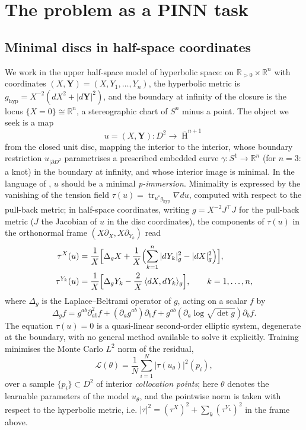 \documentclass[oneside,british]{amsart}
\numberwithin{equation}{section}
\numberwithin{figure}{section}
\theoremstyle{plain}
\numberwithin{thm}{section}
\theoremstyle{plain}
\theoremstyle{plain}
\theoremstyle{definition}
\theoremstyle{remark}
\DeclareMathOperator{\HH}{\mathrm{H}}
\DeclareMathOperator{\tr}{\mathrm{tr}}
\DeclareMathOperator{\hyp}{\mathrm{hyp}}
\begin{document}
\section{The problem as a PINN task}\label{sec:setting}

\subsection{Minimal discs in half-space coordinates}\label{subsec:halfspace}

We work in the upper half-space model of hyperbolic space: on
$\mathbb{R}_{>0}\times\mathbb{R}^{n}$ with coordinates
$(X,\boldsymbol{Y})=(X,Y_{1},\dots,Y_{n})$, the hyperbolic metric is
$g_{\hyp}=X^{-2}\left(dX^{2}+|d\boldsymbol{Y}|^{2}\right)$, and the
boundary at infinity of the closure is the locus
$\{X=0\}\cong\mathbb{R}^{n}$, a stereographic chart of $S^{n}$ minus a
point. The object we seek is a
map
\[
u=(X,\boldsymbol{Y}):D^{2}\longrightarrow\overline{\HH}^{n+1}
\]
from the closed unit disc, mapping the interior to the interior, whose
boundary restriction $u_{|\partial D^{2}}$ parametrises a prescribed
embedded curve $\gamma:S^{1}\to\mathbb{R}^{n}$ (for $n=3$: a knot) in
the boundary at infinity, and whose interior image is minimal. In the
language of \cite{SchettiniUsula2026,UsulaBiharmonic, UsulaIsometricEmbeddings}, $u$ should be a
minimal \emph{p-immersion}. Minimality is expressed by the vanishing of
the tension field $\tau(u)=\tr_{u^{*}g_{\hyp}}\nabla du$, computed with
respect to the pull-back metric; in half-space coordinates, writing
$g=X^{-2}J^{\top}J$ for the pull-back metric ($J$ the Jacobian of $u$
in the disc coordinates), the components of $\tau(u)$ in the orthonormal
frame $(X\partial_{X},X\partial_{Y_{k}})$ read
\begin{align}
\tau^{X}(u) & =\frac{1}{X}\Bigl[\Delta_{g}X+\frac{1}{X}\Bigl(\sum_{k=1}^{n}|dY_{k}|_{g}^{2}-|dX|_{g}^{2}\Bigr)\Bigr],\label{eq:tau_X}\\
\tau^{Y_{k}}(u) & =\frac{1}{X}\Bigl[\Delta_{g}Y_{k}-\frac{2}{X}\,\langle dX,dY_{k}\rangle_{g}\Bigr],\qquad k=1,\dots,n,\label{eq:tau_Y}
\end{align}
where $\Delta_{g}$ is the Laplace--Beltrami operator of $g$, acting on
a scalar $f$ by
\begin{equation}
\Delta_{g}f=g^{ab}\partial_{ab}^{2}f+(\partial_{a}g^{ab})\partial_{b}f+g^{ab}(\partial_{a}\log\sqrt{\det g})\partial_{b}f.\label{eq:LB}
\end{equation}
The equation $\tau(u)=0$ is a quasi-linear second-order elliptic
system, degenerate at the boundary, with no general method available
to solve it explicitly. Training minimises the Monte Carlo $L^{2}$
norm of the residual,
\begin{equation}
\mathcal{L}(\theta)=\frac{1}{N}\sum_{i=1}^{N}\left|\tau(u_{\theta})\right|^{2}(p_{i}),\label{eq:loss}
\end{equation}
over a sample $\{p_{i}\}\subset D^{2}$ of interior \emph{collocation
points}; here $\theta$ denotes the learnable parameters of the model
$u_{\theta}$, and the pointwise norm is taken with respect to the
hyperbolic metric, i.e.
$|\tau|^{2}=(\tau^{X})^{2}+\sum_{k}(\tau^{Y_{k}})^{2}$ in the frame
above.
\end{document}
